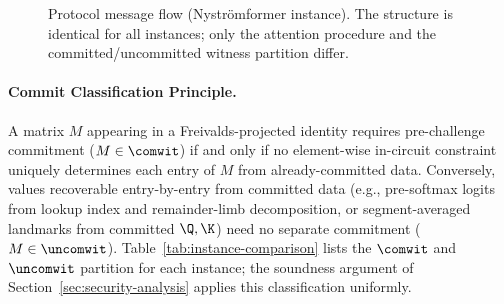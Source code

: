 \begin{figure}[!t]
\centering
\newsavebox{\protocolbox}
%
\resizebox{0.9\textwidth}{!}{\usebox{\protocolbox}}
    \caption{Protocol message flow (Nystr\"omformer instance). The structure is identical for all instances; only the attention procedure and the committed/uncommitted witness partition differ.}
    \label{fig:protocol}
\end{figure}

\paragraph{Commit Classification Principle.}
A matrix $M$ appearing in a Freivalds-projected identity requires pre-challenge commitment ($M \in \comwit$) if and only if no element-wise in-circuit constraint uniquely determines each entry of $M$ from already-committed data. Conversely, values recoverable entry-by-entry from committed data (e.g., pre-softmax logits from lookup index and remainder-limb decomposition, or segment-averaged landmarks from committed $\Q, \K$) need no separate commitment ($M \in \uncomwit$). Table~\ref{tab:instance-comparison} lists the $\comwit$ and $\uncomwit$ partition for each instance; the soundness argument of Section~\ref{sec:security-analysis} applies this classification uniformly.
